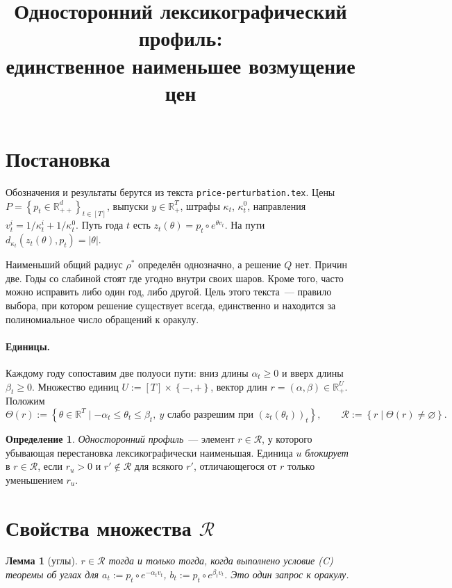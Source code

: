 \documentclass[a4paper,11pt]{article}
\title{Односторонний лексикографический профиль:\\ единственное наименьшее возмущение цен}
\date{}
\theoremstyle{plain}
\newtheorem{lemma}[theorem]{Лемма}
\theoremstyle{definition}
\newtheorem{definition}[theorem]{Определение}
\theoremstyle{remark}
\newcommand{\R}{\mathbb{R}}
\newcommand{\abs}[1]{\left\lvert #1 \right\rvert}
\newcommand{\set}[1]{\left\{ #1 \right\}}
\newcommand{\Rpp}[1][2]{\R^{#1}_{++}}
\newcommand{\Rp}[1][2]{\R^{#1}_{+}}
\begin{document}
\maketitle

\section{Постановка}

Обозначения и результаты берутся из текста \texttt{price-perturbation.tex}. Цены $P=\set{p_t\in\Rpp[d]}_{t\in[T]}$, выпуски $y\in\Rp[T]$, штрафы $\kappa_t$, $\kappa^0_t$, направления $v^i_t=1/\kappa^i_t+1/\kappa^0_t$. Путь года $t$ есть $z_t(\theta)=p_t\circ e^{\theta v_t}$. На пути $d_{\kappa_t}(z_t(\theta),p_t)=\abs\theta$.

Наименьший общий радиус $\rho^*$ определён однозначно, а решение $Q$ нет. Причин две. Годы со слабиной стоят где угодно внутри своих шаров. Кроме того, часто можно исправить либо один год, либо другой. Цель этого текста~--- правило выбора, при котором решение существует всегда, единственно и находится за полиномиальное число обращений к оракулу.

\paragraph{Единицы.} Каждому году сопоставим две полуоси пути: вниз длины $\alpha_t\ge0$ и вверх длины $\beta_t\ge0$. Множество единиц $U:=[T]\times\set{-,+}$, вектор длин $r=(\alpha,\beta)\in\Rp[U]$. Положим
\[
    \Theta(r):=\set{\theta\in\R^T\mid-\alpha_t\le\theta_t\le\beta_t,\ y\text{ слабо разрешим при }(z_t(\theta_t))_t},\qquad\mathcal R:=\set{r\mid\Theta(r)\ne\varnothing}.
\]

\begin{definition}
    \textit{Односторонний профиль}~--- элемент $r\in\mathcal R$, у которого убывающая перестановка лексикографически наименьшая. Единица $u$ \textit{блокирует} в $r\in\mathcal R$, если $r_u>0$ и $r'\notin\mathcal R$ для всякого $r'$, отличающегося от $r$ только уменьшением $r_u$.
\end{definition}

\section{\texorpdfstring{Свойства множества $\mathcal R$}{Свойства множества R}}

\begin{lemma}[углы]\label{lem:corners}
    $r\in\mathcal R$ тогда и только тогда, когда выполнено условие (C) теоремы об углах для $a_t:=p_t\circ e^{-\alpha_tv_t}$, $b_t:=p_t\circ e^{\beta_tv_t}$. Это один запрос к оракулу.
\end{lemma}
\end{document}
